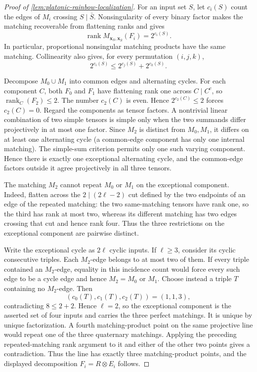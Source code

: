 \documentclass[11pt,letterpaper,onecolumn]{article}
\theoremstyle{plain}
\theoremstyle{definition}
\theoremstyle{remark}
\newcommand{\rank}{\operatorname{rank}}
\begin{document}
\begin{proof}[Proof of \cref{lem:platonic-rainbow-localization}]
For an input set \(S\), let \(c_i(S)\) count the edges of \(M_i\) crossing
\(S\mid\bar S\).  Nonsingularity of every binary factor makes the matching
recoverable from flattening ranks and gives
\[
 \rank M_{\mathbf x_S,\mathbf x_{\bar S}}(F_i)=2^{c_i(S)}.
\]
In particular, proportional nonsingular matching products have the same
matching.  Collinearity also gives, for every permutation \((i,j,k)\),
\[
 2^{c_i(S)}\le2^{c_j(S)}+2^{c_k(S)}.
\]

Decompose \(M_0\cup M_1\) into common edges and alternating cycles.  For
each component \(C\), both \(F_0\) and \(F_1\) have flattening rank one
across \(C\mid C^c\), so \(\rank_C(F_2)\le2\).  The number \(c_2(C)\) is
even. Hence \(2^{c_2(C)}\le2\) forces \(c_2(C)=0\).  Regard the components
as tensor factors.  A nontrivial linear combination of two simple tensors
is simple only when the two summands differ projectively in at most one
factor.  Since \(M_2\) is distinct from \(M_0,M_1\), it differs on at least
one alternating cycle (a common-edge component has only one internal
matching).  The simple-sum criterion permits only one such varying
component. Hence there is exactly one exceptional alternating cycle, and
the common-edge factors outside it agree projectively in all three tensors.

The matching \(M_2\) cannot repeat \(M_0\) or \(M_1\) on the exceptional
component.  Indeed, flatten across the \(2\mid(2\ell-2)\) cut defined by
the two endpoints of an edge of the repeated matching: the two same-matching
tensors have rank one, so the third
has rank at most two, whereas its different matching has two edges crossing
that cut and hence rank four.  Thus the three restrictions on the
exceptional component are pairwise distinct.

Write the exceptional cycle as \(2\ell\) cyclic inputs.  If \(\ell\ge3\),
consider its cyclic consecutive triples.  Each \(M_2\)-edge belongs to at
most two of them.  If every triple contained an \(M_2\)-edge, equality in
this incidence count would force every such edge to be a cycle edge and
hence \(M_2=M_0\) or \(M_1\).  Choose instead a triple \(T\) containing no
\(M_2\)-edge.  Then
\[
 (c_0(T),c_1(T),c_2(T))=(1,1,3),
\]
contradicting \(8\le2+2\).  Hence \(\ell=2\), so the exceptional component
is the asserted set of four inputs and carries the three perfect matchings.  It
is unique by unique factorization.  A fourth matching-product point on the
same projective line would repeat one of the three quaternary matchings.
Applying the preceding repeated-matching rank argument to it and either of
the other two points gives a contradiction.  Thus the line has exactly
three matching-product points, and the displayed decomposition
\(F_i=R\otimes E_i\) follows.


\end{proof}
\end{document}
